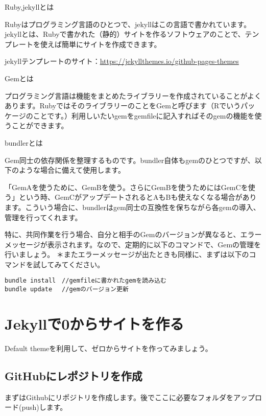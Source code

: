 \documentclass[
]{book}
\begin{document}
Ruby,jekyllとは

Rubyはプログラミング言語のひとつで、jekyllはこの言語で書かれています。jekyllとは、Rubyで書かれた（静的）サイトを作るソフトウェアのことで、テンプレートを使えば簡単にサイトを作成できます。

jekyllテンプレートのサイト：\url{https://jekyllthemes.io/github-pages-themes}

Gemとは

プログラミング言語は機能をまとめたライブラリーを作成されていることがよくあります。RubyではそのライブラリーのことをGemと呼びます（Rでいうパッケージのことです。）利用しいたいgemをgemfileに記入すればそのgemの機能を使うことができます。

bundlerとは

Gem同士の依存関係を整理するものです。bundler自体もgemのひとつですが、以下のような場合に備えて使用します。

「GemAを使うために、GemBを使う。さらにGemBを使うためにはGemCを使う」という時、GemCがアップデートされるとAもBも使えなくなる場合があります。こういう場合に、bundlerはgem同士の互換性を保ちながら各gemの導入、管理を行ってくれます。

特に、共同作業を行う場合、自分と相手のGemのバージョンが異なると、エラーメッセージが表示されます。なので、定期的に以下のコマンドで、Gemの管理を行いましょう。
＊またエラーメッセージが出たときも同様に、まずは以下のコマンドを試してみてください。

\begin{verbatim}
bundle install　//gemfileに書かれたgemを読み込む
bundle update 　//gemのバージョン更新
\end{verbatim}

\hypertarget{jekyllux30670ux304bux3089ux30b5ux30a4ux30c8ux3092ux4f5cux308b}{%
\chapter{Jekyllで0からサイトを作る}\label{jekyllux30670ux304bux3089ux30b5ux30a4ux30c8ux3092ux4f5cux308b}}

Default themeを利用して、ゼロからサイトを作ってみましょう。

\hypertarget{githubux306bux30ecux30ddux30b8ux30c8ux30eaux3092ux4f5cux6210}{%
\section{GitHubにレポジトリを作成}\label{githubux306bux30ecux30ddux30b8ux30c8ux30eaux3092ux4f5cux6210}}

まずはGithubにリポジトリを作成します。後でここに必要なフォルダをアップロード(push)します。
\end{document}
